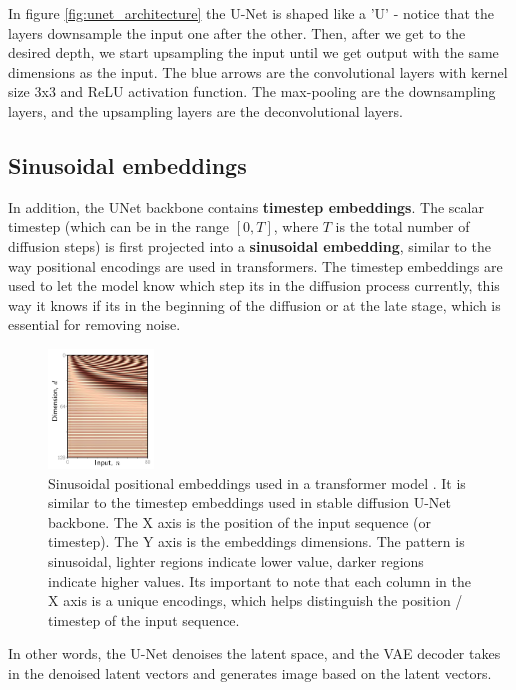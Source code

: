 In figure \ref{fig:unet_architecture} the U-Net is shaped like a 'U' - notice that the layers downsample the input one after the other. Then, after we get to the desired depth, we start upsampling the input until we get output with the same dimensions as the input. The blue arrows are the convolutional layers with kernel size 3x3 and ReLU activation function. The max-pooling are the downsampling layers, and the upsampling layers are the deconvolutional layers.

\subsection{Sinusoidal embeddings}
\label{subsec:sinusoidal_embeddings}

In addition, the UNet backbone contains \textbf{timestep embeddings}. The scalar timestep (which can be in the range $[0, T]$, where $T$ is the total number of diffusion steps) is first projected into a \textbf{sinusoidal embedding}, similar to the way positional encodings are used in transformers. The timestep embeddings are used to let the model know which step its in the diffusion process currently, this way it knows if its in the beginning of the diffusion or at the late stage, which is essential for removing noise.

\begin{figure}[h]
    \centering
    \includegraphics[width=0.25\textwidth]{images/diffusion_models/stable_diffusion/positional_encodings.png}
    \caption{Sinusoidal positional embeddings used in a transformer model \cite{understanding_deep_learning_book_2024}. It is similar to the timestep embeddings used in stable diffusion U-Net backbone. The X axis is the position of the input sequence (or timestep). The Y axis is the embeddings dimensions. The pattern is sinusoidal, lighter regions indicate lower value, darker regions indicate higher values. Its important to note that each column in the X axis is a unique encodings, which helps distinguish the position / timestep of the input sequence.}
\end{figure}

In other words, the U-Net denoises the latent space, and the VAE decoder takes in the denoised latent vectors and generates image based on the latent vectors.

